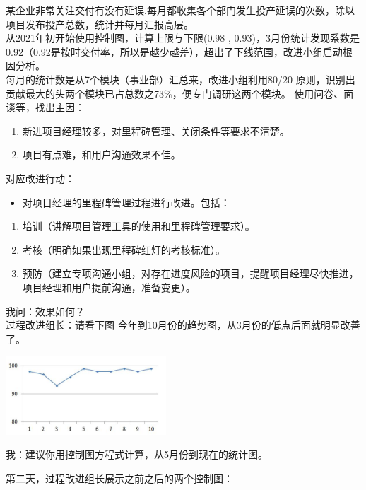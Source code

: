 某企业非常关注交付有没有延误,每月都收集各个部门发生投产延误的次数，除以项目发布投产总数，统计并每月汇报高层。\\
从2021年初开始使用控制图，计算上限与下限(0.98 ,
0.93)，3月份统计发现系数是0.92（0.92是按时交付率，所以是越少越差），超出了下线范围，改进小组启动根因分析。\\
每月的统计数是从7个模块（事业部）汇总来，改进小组利用80/20
原则，识别出贡献最大的头两个模块已占总数之73\%，便专门调研这两个模块。
使用问卷、面谈等，找出主因：

\begin{enumerate}
\tightlist
\item
  新进项目经理较多，对里程碑管理、关闭条件等要求不清楚。
\item
  项目有点难，和用户沟通效果不佳。
\end{enumerate}

对应改进行动：

\begin{itemize}
\tightlist
\item
  对项目经理的里程碑管理过程进行改进。包括：
\end{itemize}

\begin{enumerate}
\tightlist
\item
  培训（讲解项目管理工具的使用和里程碑管理要求）。
\item
  考核（明确如果出现里程碑红灯的考核标准）。
\item
  预防（建立专项沟通小组，对存在进度风险的项目，提醒项目经理尽快推进，项目经理和用户提前沟通，准备变更）。
\end{enumerate}

我问：效果如何？\\
过程改进组长：请看下图
今年到10月份的趋势图，从3月份的低点后面就明显改善了。


\includegraphics[width=6cm]{M3_CC_figure1.jpg}

我：建议你用控制图方程式计算，从5月份到现在的统计图。

第二天，过程改进组长展示之前之后的两个控制图：

\begin{description}
\item[]
\end{description}

